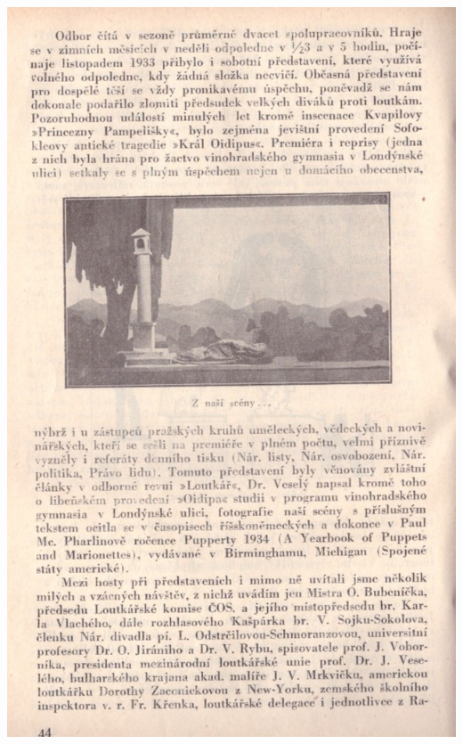 \documentclass[11pt]{article}
\begin{document}
\includegraphics[width=\imagewidth]{original/1934/Skener_20250325 (13).jpg}
\end{document}
